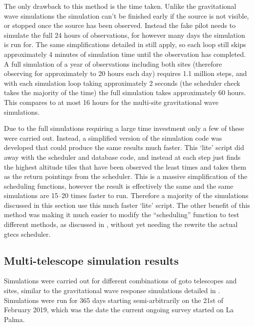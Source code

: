 \begin{colsection}
\begin{colsection}
The only drawback to this method is the time taken. Unlike the gravitational wave simulations the simulation can't be finished early if the source is not visible, or stopped once the source has been observed. Instead the fake pilot needs to simulate the full 24 hours of observations, for however many days the simulation is run for. The same simplifications detailed in  still apply, so each loop still skips approximately 4 minutes of simulation time until the observation has completed. A full simulation of a year of observations including both sites (therefore observing for approximately to 20 hours each day) requires 1.1 million steps, and with each simulation loop taking approximately 2 seconds (the scheduler check takes the majority of the time) the full simulation takes approximately 60 hours. This compares to at most 16 hours for the multi-site gravitational wave simulations.

Due to the full simulations requiring a large time investment only a few of these were carried out. Instead, a simplified version of the simulation code was developed that could produce the same results much faster. This `lite' script did away with the scheduler and database code, and instead at each step just finds the highest altitude tiles that have been observed the least times and takes them as the return pointings from the scheduler. This is a massive simplification of the scheduling functions, however the result is effectively the same and the same simulations are 15--20 times faster to run. Therefore a majority of the simulations discussed in this section use this much faster `lite' script. The other benefit of this method was making it much easier to modify the ``scheduling'' function to test different methods, as discussed in , without yet needing the rewrite the actual \gls{gtecs} scheduler.

\end{colsection}


\subsection{Multi-telescope simulation results}
\label{sec:survey_sim_results}
\begin{colsection}

Simulations were carried out for different combinations of \gls{goto} telescopes and sites, similar to the gravitational wave response simulations detailed in . Simulations were run for 365 days starting semi-arbitrarily on the 21st of February 2019, which was the date the current ongoing survey started on La Palma.


\end{colsection}
\end{colsection}
